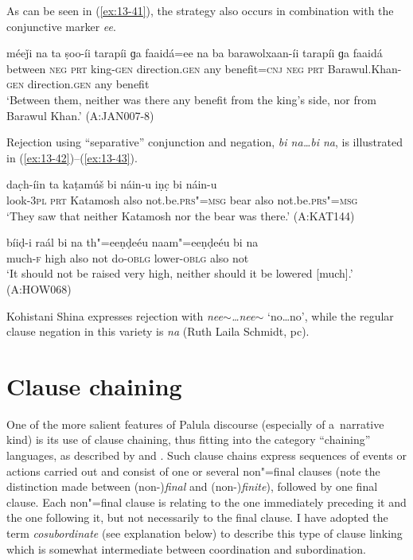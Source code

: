 As can be seen in (\ref{ex:13-41}), the strategy also occurs in combination with the conjunctive marker \textit{ee}.

\begin{exe}
\ex
\label{ex:13-41}
\gll méeǰi na ta ṣoo-íi tarapíi ɡa faaidá=ee na ba barawolxaan-íi tarapíi ɡa faaidá \\
between \textsc{neg} \textsc{prt } king-\textsc{gen} direction.\textsc{gen} any benefit=\textsc{cnj} \textsc{neg} \textsc{prt} Barawul.Khan-\textsc{gen} direction.\textsc{gen} any benefit  \\
\glt `Between them, neither was there any benefit from the king's side, nor from Barawul Khan.' (A:JAN007-8) 
\end{exe}

Rejection using ``separative'' conjunction and negation, \textit{bi na{\ldots}bi na}, is illustrated in (\ref{ex:13-42})--(\ref{ex:13-43}).

\begin{exe}
\ex
\label{ex:13-42}
\gll dac̣h-íin ta kaṭamúš bi náin-u iṇc̣ bi náin-u \\
look-\textsc{3pl} \textsc{prt} Katamosh also not.be.\textsc{prs"=msg} bear also not.be.\textsc{prs"=msg} \\
\glt `They saw that neither Katamosh nor the bear was there.' (A:KAT144)

\ex
\label{ex:13-43}
\gll bíiḍ-i raál bi na th"=eeṇḍeéu naam"=eeṇḍeéu bi na \\
much-\textsc{f} high also not do-\textsc{oblg} lower-\textsc{oblg} also not  \\
\glt `It should not be raised very high, neither should it be lowered [much].' (A:HOW068) 
\end{exe}

Kohistani Shina expresses rejection with \textit{nee$\sim${\ldots}nee$\sim$} `no{\ldots}no', while the regular clause negation in this variety is \textit{na} (Ruth Laila Schmidt, pc).


\section{Clause chaining}
\label{sec:13-3}

One of the more salient features of Palula discourse (especially of a~narrative kind) is its use of clause chaining, thus fitting into the category ``chaining'' languages, as described by \citet[242]{thompsonetal2007} and \citet[374--376]{longacre2007}. Such clause chains express sequences of events or actions carried out and consist of one or several non"=final clauses (note the distinction made between (non-)\textit{final} and (non-)\textit{finite}), followed by one final clause. Each non"=final clause is relating to the one immediately preceding it and the one following it, but not necessarily to the final clause. I have adopted the term \textit{cosubordinate} (see explanation below) to describe this type of clause linking which is somewhat intermediate between coordination and subordination.


